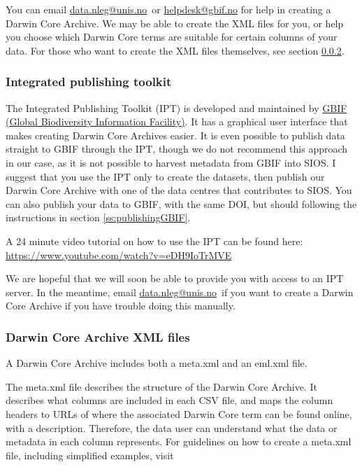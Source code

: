 \documentclass[a4paper,english, 11pt]{article}
\makeatletter
\newcommand{\emailme}{\href{mailto:data.nleg@unis.no}{data.nleg@unis.no}}
\makeatother
\begin{document}
You can email \emailme \ or \href{mailto:helpdesk@gbif.no}{helpdesk@gbif.no} for help in creating a Darwin Core Archive. We may be able to create the XML files for you, or help you choose which Darwin Core terms are suitable for certain columns of your data. For those who want to create the XML files themselves, see section \ref{ss:xml}.

\subsubsection{Integrated publishing toolkit}
\label{ss:ipt}

The Integrated Publishing Toolkit (IPT) is developed and maintained by \href{https://www.gbif.org/}{GBIF (Global Biodiversity Information Facility)}. It has a graphical user interface that makes creating Darwin Core Archives easier. It is even possible to publish data straight to GBIF through the IPT, though we do not recommend this approach in our case, as it is not possible to harvest metadata from GBIF into SIOS. I suggest that you use the IPT only to create the datasets, then publish our Darwin Core Archive with one of the data centres that contributes to SIOS. You can also publish your data to GBIF, with the same DOI, but should following the instructions in section \ref{ss:publishingGBIF}. 

A 24 minute video tutorial on how to use the IPT can be found here:\\ 
\url{https://www.youtube.com/watch?v=eDH9IoTrMVE}

We are hopeful that we will soon be able to provide you with access to an IPT server. In the meantime, email \emailme \ if you want to create a Darwin Core Archive if you have trouble doing this manually.

\subsubsection{Darwin Core Archive XML files}
\label{ss:xml}

A Darwin Core Archive includes both a meta.xml and an eml.xml file.

The meta.xml file describes the structure of the Darwin Core Archive. It describes what columns are included in each CSV file, and maps the column headers to URLs of where the associated Darwin Core term can be found online, with a description. Therefore, the data user can understand what the data or metadata in each column represents. For guidelines on how to create a meta.xml file, including simplified examples, visit
\end{document}
